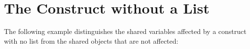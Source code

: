 \pagebreak
\chapter{The  Construct without a List}
\label{chap:flush_nolist}

The following example distinguishes the shared variables affected by a  
construct with no list from the shared objects that are not affected:




